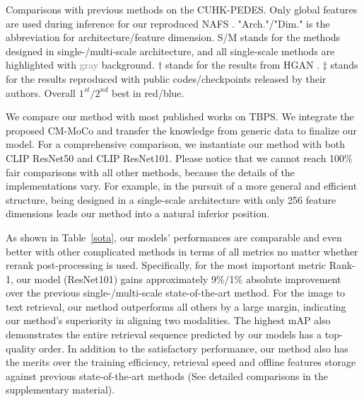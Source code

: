 \documentclass{bmvc2k}
\newcommand{\first}[1]{\textcolor{myred}{#1}}
\newcommand{\second}[1]{\textcolor{myblue}{#1}}
\newcommand{\revision}[1]{#1}
\begin{document}
\begin{table}[t]
\begin{center}
{}
\end{center}
\caption{Comparisons with previous methods on the CUHK-PEDES. \revision{Only global features are used during inference for our reproduced NAFS \cite{gao2021contextual}. "Arch."/"Dim." is the abbreviation for architecture/feature dimension. S/M stands for the methods designed in single-/multi-scale architecture, and all single-scale methods are highlighted with \textcolor{gray}{gray} background.} $\dagger$ stands for the results from HGAN \cite{zheng2020hierarchical}. $\ddagger$ stands for the results reproduced with public codes/checkpoints released by their authors. Overall $1^{st}/2^{nd}$ best in \first{red}/\second{blue}.}
\label{sota}
\end{table}
 We compare our method with most published works on TBPS. 
We integrate the proposed CM-MoCo and transfer the knowledge from generic data to finalize our model. 
For a comprehensive comparison, we instantiate our method with both CLIP ResNet50 and CLIP ResNet101.
\revision{Please notice that we cannot reach 100\% fair comparisons with all other methods, because the details of the implementations vary. For example, in the pursuit of a more general and efficient structure, being designed in a single-scale architecture with only 256 feature dimensions leads our method into a natural inferior position.}

As shown in Table~\ref{sota}, our models' performances are comparable and even better with other complicated methods in terms of all metrics no matter whether rerank post-processing is used.
Specifically, for the most important metric Rank-1, our model (ResNet101) gains approximately 9\%/1\% absolute improvement over the previous single-/multi-scale state-of-the-art method. 
\revision{For the image to text retrieval, our method outperforms all others by a large margin, indicating our method's superiority in aligning two modalities. The highest mAP also demonstrates the entire retrieval sequence predicted by our models has a top-quality order. In addition to the satisfactory performance, our method also has the merits over the training efficiency, retrieval speed and offline features storage against previous state-of-the-art methods (See detailed comparisons in the supplementary material).}
\end{document}
